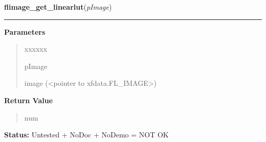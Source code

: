 \hspace{.8\funcindent}\begin{boxedminipage}{\funcwidth}

    \raggedright \textbf{flimage\_get\_linearlut}(\textit{pImage})

    \vspace{-1.5ex}

    \rule{\textwidth}{0.5\fboxrule}
\setlength{\parskip}{2ex}
\setlength{\parskip}{1ex}
      \textbf{Parameters}
      \vspace{-1ex}

      \begin{quote}
        \begin{Ventry}{xxxxxx}

          \item[pImage]

          image ({\textless}pointer to xfdata.FL\_IMAGE{\textgreater})

        \end{Ventry}

      \end{quote}

      \textbf{Return Value}
    \vspace{-1ex}

      \begin{quote}
      num

      \end{quote}

\textbf{Status:} Untested + NoDoc + NoDemo = NOT OK



    \end{boxedminipage}

    \label{xformslib:flflimage:flimage_invalidate_pixels}

    \vspace{0.5ex}


